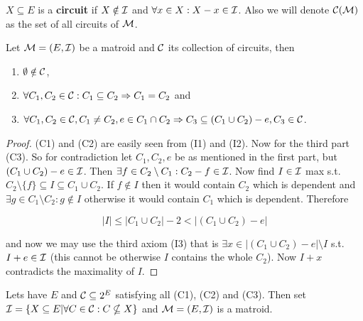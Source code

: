 \begin{defn}
	$X \subseteq E$ is a \textbf{circuit} if $X \notin \mathcal{I}$ and $\forall x \in X : X - x \in \mathcal{I}$. Also we will denote $\mathcal{C}(\mathcal{M})$ as the set of all circuits of $\mathcal{M}$.
\end{defn}

\begin{lemma}
	Let $\mathcal{M} = (E, \mathcal{I})$ be a matroid and $\mathcal{C}$ its collection of circuits, then
	
	\begin{enumerate}[(C1)]
		\item $\emptyset \notin \mathcal{C}$,
		\item $\forall C_1, C_2 \in \mathcal{C} : C_1 \subseteq C_2 \Rightarrow C_1 = C_2$ and
		\item $\forall C_1, C_2 \in \mathcal{C}, C_1 \neq C_2, e \in C_1 \cap C_2 \Rightarrow C_3 \subseteq (C_1 \cup C_2) -e , C_3 \in \mathcal{C}$.
	\end{enumerate}
\end{lemma}

\begin{proof}
	(C1) and (C2) are easily seen from (I1) and (I2). Now for the third part (C3). So for contradiction let $C_1, C_2, e$ be as mentioned in the first part, but $(C_1 \cup C_2) - e \in \mathcal{I}$. Then $\exists f \in C_2 \setminus C_1 : C_2 - f \in \mathcal{I}$. Now find $I \in \mathcal{I}$ max s.t. $C_2 \setminus \{f\} \subseteq I \subseteq C_1 \cup C_2$. If $f \notin I$ then it would contain $C_2$ which is dependent and $\exists g \in C_1 \setminus C_2 : g \notin I$ otherwise it would contain $C_1$ which is dependent. Therefore
	
	$$
	|I| \leq | C_1 \cup C_2 | - 2 < |(C_1 \cup C_2) - e|
	$$
	
	\noindent and now we may use the third axiom (I3) that is $\exists x \in |(C_1 \cup C_2) - e| \setminus I$ s.t. $I + e \in \mathcal{I}$ (this cannot be otherwise $I$ contains the whole $C_2$). Now $I + x$ contradicts the maximality of $I$.
\end{proof}

\begin{claim}
	Lets have $E$ and $\mathcal{C} \subseteq 2^E$ satisfying all (C1), (C2) and (C3). Then set $\mathcal{I} = \{X \subseteq E | \forall C \in \mathcal{C} : C \nsubseteq X\}$ and $\mathcal{M} = (E, \mathcal{I})$ is a matroid.
\end{claim}

